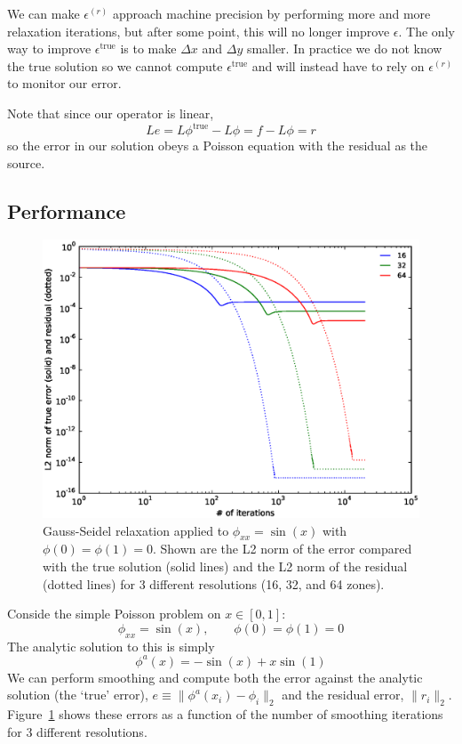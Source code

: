 We can make $\epsilon^{(r)}$ approach machine precision by performing
more and more relaxation iterations, but after some point, this will
no longer improve $\epsilon$.  The only way to improve
$\epsilon^\mathrm{true}$ is to make $\Delta x$ and $\Delta y$ smaller.
In practice we do not know the true solution so we cannot compute
$\epsilon^\mathrm{true}$ and will instead have to rely on
$\epsilon^{(r)}$ to monitor our error.

Note that since our operator is linear,
\begin{equation}
L e = L\phi^\mathrm{true} - L\phi = f - L\phi = r
\end{equation}
so the error in our solution obeys a Poisson equation with the residual
as the source.

\subsection{Performance}


\begin{figure}
\centering
\includegraphics[width=5.5in]{smooth-error.eps}
\caption[Convergence as a function of number of iterations using Gauss-Seidel relaxation.]{\label{fig:smootherror} Gauss-Seidel relaxation applied to
  $\phi_{xx} = \sin(x)$ with $\phi(0) = \phi(1) = 0$.  Shown are the
  L2 norm of the error compared with the true solution (solid lines)
  and the L2 norm of the residual (dotted lines) for 3 different
  resolutions (16, 32, and 64 zones).}
\end{figure}

Conside the simple Poisson problem on $x \in [0,1]$:
\begin{equation}
\phi_{xx} = \sin(x), \qquad \phi(0) = \phi(1) = 0
\end{equation}
The analytic solution to this is simply 
\begin{equation}
\phi^a(x) = -\sin(x) + x \sin(1)
\end{equation}
We can perform smoothing and compute both the error against the
analytic solution (the `true' error), $e \equiv \| \phi^a(x_i) - \phi_i \|_2$ and the
residual error, $\| r_i \|_2$.  Figure~\ref{fig:smootherror} shows these
errors as a function of the number of smoothing iterations for 3
different resolutions.

